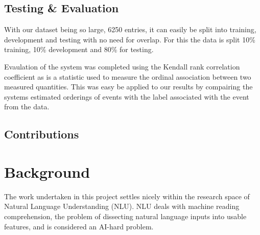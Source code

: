 \documentclass[bsc,frontabs,twoside,singlespacing,parskip,deptreport]{infthesis}     %
\begin{document}



\section{Testing \& Evaluation}
With our dataset being so large, 6250 entries, it can
easily be split into training, development and testing with no
need for overlap. For this the data is split 10\% training,
10\% development and 80\% for testing.

Evaulation of the system was completed using the
Kendall rank correlation coefficient as is a statistic
used to measure the ordinal association between two
measured quantities. This was easy be applied to our results
by compairing the systems estimated orderings of events
with the label associated with the event from the data.

\section{Contributions}

\chapter{Background}
The work undertaken in this project settles nicely within the research space of Natural Language Understanding (NLU).
NLU deals with machine reading comprehension, the problem of dissecting natural language inputs into usable features,
and is considered an AI-hard problem.
\end{document}

